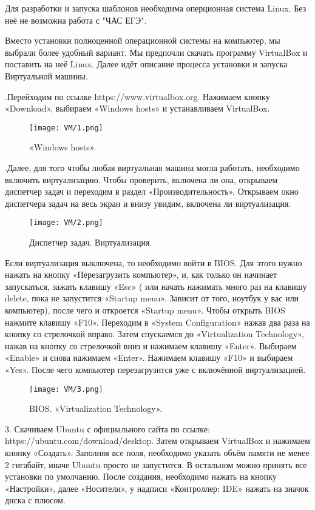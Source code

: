 Для разработки и запуска шаблонов необходима оперционная система Linux. Без неё не возможна работа с "ЧАС ЕГЭ".

Вместо установки полноценной операционной системы на компьютер, мы выбрали более удобный вариант. Мы предпочли скачать программу VirtualBox и поставить на неё Linux. Далее идёт описание процесса установки и запуска Виртуальной машины.

.\quad Перейходим по ссылке https://www.virtualbox.org. Нажимаем кнопку «Download», выбираем «Windows hosts» и устанавливаем VirtualBox. 

\begin{figure}[h]	
		\centering
		\texttt{[image: VM/1.png]}
\caption{«Windows hosts».}
\label{ris:image}
\end{figure}

.\quad Далее, для того чтобы любая виртуальная машина могла работать, необходимо включить виртуализацию. Чтобы проверить, включена ли она, открываем диспетчер задач и переходим в раздел «Производительность». Открываем окно диспетчера задач на весь экран и внизу увидим, включена ли виртуализация.

\begin{figure}[h]
		\centering
		\texttt{[image: VM/2.png]}
\caption{Диспетчер задач. Виртуализация.}
\label{ris:image}
\end{figure}

\quad Если виртуализация выключена, то необходимо войти в BIOS. Для этого нужно нажать на кнопку «Перезагрузить компьютер», и, как только он начинает запускаться, зажать клавишу «Esc» ( или начать нажимать много раз на клавишу delete, пока не запустится «Startup menu». Зависит от того, ноутбук у вас или компьютер), после чего и откроется «Startup menu». Чтобы открыть BIOS нажмите клавишу «F10». Переходим в «System Configuration» нажав два раза на кнопку со стрелочкой вправо. Затем спускаемся до «Virtualization Technology», нажав на кнопку со стрелочкой вниз и нажимаем клавишу «Enter». Выбираем «Enable» и снова нажимаем «Enter». Нажимаем клавишу «F10» и выбираем «Yes». После чего компьютер перезагрузится уже с включённой виртуализацией.

\begin{figure}[h]
		\centering
		\texttt{[image: VM/3.png]}
\caption{BIOS. «Virtualization Technology».}
\label{ris:image}
\end{figure}

3. Скачиваем Ubuntu с официального сайта по ссылке: https://ubuntu.com/download/desktop. Затем открываем VirtualBox и нажимаем кнопку «Создать». Заполняя все поля, необходимо указать объём памяти не менее 2 гигабайт, иначе Ubuntu просто не запустится. В остальном можно принять все установки по умолчанию. После создания, необходимо нажать на кнопку «Настройки», далее «Носители», у надписи «Контроллер: IDE» нажать на значок диска с плюсом. 

